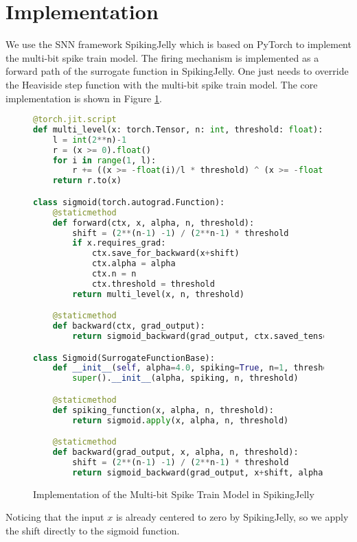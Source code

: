 \section{Implementation}
\label{sec:implementation}

    We use the SNN framework SpikingJelly which is based on PyTorch to implement the multi-bit spike train model. The firing mechanism is implemented as a forward path of the surrogate function in SpikingJelly. One just needs to override the Heaviside step function with the multi-bit spike train model. The core implementation is shown in Figure \ref{listing:multi-bit-spike}.
    \begin{figure}[!htpb]
        \centering
        \begin{lstlisting}[language=Python, basicstyle=\small, breaklines=true]
@torch.jit.script
def multi_level(x: torch.Tensor, n: int, threshold: float):
    l = int(2**n)-1
    r = (x >= 0).float()
    for i in range(1, l):
        r += ((x >= -float(i)/l * threshold) ^ (x >= -float(i-1)/l * threshold)) * float(l-i)/l
    return r.to(x)

class sigmoid(torch.autograd.Function):
    @staticmethod
    def forward(ctx, x, alpha, n, threshold):
        shift = (2**(n-1) -1) / (2**n-1) * threshold
        if x.requires_grad:
            ctx.save_for_backward(x+shift)
            ctx.alpha = alpha
            ctx.n = n
            ctx.threshold = threshold
        return multi_level(x, n, threshold)

    @staticmethod
    def backward(ctx, grad_output):
        return sigmoid_backward(grad_output, ctx.saved_tensors[0], ctx.alpha, ctx.n, ctx.threshold)

class Sigmoid(SurrogateFunctionBase):
    def __init__(self, alpha=4.0, spiking=True, n=1, threshold=1.0):
        super().__init__(alpha, spiking, n, threshold)

    @staticmethod
    def spiking_function(x, alpha, n, threshold):
        return sigmoid.apply(x, alpha, n, threshold)

    @staticmethod
    def backward(grad_output, x, alpha, n, threshold):
        shift = (2**(n-1) -1) / (2**n-1) * threshold
        return sigmoid_backward(grad_output, x+shift, alpha, n, threshold)[0]
        \end{lstlisting}
        \caption{Implementation of the Multi-bit Spike Train Model in SpikingJelly}
        \label{listing:multi-bit-spike}
    \end{figure}

    Noticing that the input $x$ is already centered to zero by SpikingJelly, so we apply the shift directly to the sigmoid function. 
